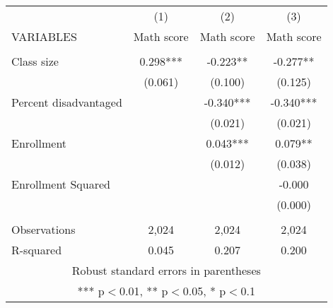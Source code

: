 \documentclass[]{article}
\begin{document}
\begin{tabular}{lccc} \hline
 & (1) & (2) & (3) \\
VARIABLES & Math score & Math score & Math score \\ \hline
 &  &  &  \\
Class size & 0.298*** & -0.223** & -0.277** \\
 & (0.061) & (0.100) & (0.125) \\
Percent disadvantaged &  & -0.340*** & -0.340*** \\
 &  & (0.021) & (0.021) \\
Enrollment &  & 0.043*** & 0.079** \\
 &  & (0.012) & (0.038) \\
Enrollment Squared &  &  & -0.000 \\
 &  &  & (0.000) \\
 &  &  &  \\
Observations & 2,024 & 2,024 & 2,024 \\
 R-squared & 0.045 & 0.207 & 0.200 \\ \hline
\multicolumn{4}{c}{ Robust standard errors in parentheses} \\
\multicolumn{4}{c}{ *** p$<$0.01, ** p$<$0.05, * p$<$0.1} \\
\end{tabular}
\end{document}
